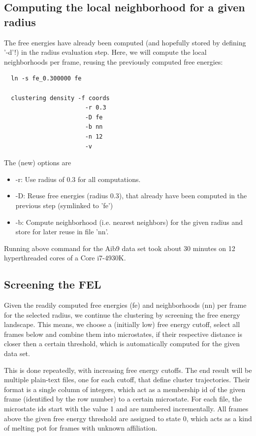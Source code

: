 \documentclass[12pt,a4paper,twoside,english,fleqn]{article}
\begin{document}
\subsection{Computing the local neighborhood for a given radius}
The free energies have already been computed (and hopefully stored by defining
'-d'!) in the radius evaluation step.
Here, we will compute the local neighborhoods per frame, reusing the previously
computed free energies:
\begin{lstlisting}
  ln -s fe_0.300000 fe

  clustering density -f coords
                       -r 0.3
                       -D fe
                       -b nn
                       -n 12
                       -v
\end{lstlisting}
The (new) options are
\begin{itemize}
  \item -r: Use radius of 0.3 for all computations.
  \item -D: Reuse free energies (radius 0.3), that already have been
            computed in the previous step (symlinked to 'fe')
  \item -b: Compute neighborhood (i.e. nearest neighbors) for the given
            radius and store for later reuse in file 'nn'.
\end{itemize}


\begin{mdframed}[innertopmargin=20pt]
  Running above command for the Aib9 data set took about 30 minutes on
  12 hyperthreaded cores of a Core i7-4930K.
\end{mdframed}




\subsection{Screening the FEL\label{sec:screening}}
Given the readily computed free energies (fe) and neighborhoods (nn)
per frame for the selected radius,
we continue the clustering by screening the free energy landscape.
This means, we choose a (initially low) free energy cutoff, select all frames
below and combine them into microstates, if their respective distance is closer
then a certain threshold, which is automatically computed for the given data
set.

This is done repeatedly, with increasing free energy cutoffs.
The end result will be multiple plain-text files, one for each cutoff, that
define cluster trajectories. Their format is a single column of integers, which
act as a membership id of the given frame (identified by the row number) to
a certain microstate.
For each file, the microstate ids start with the value 1 and are numbered
incrementally. All frames above the given free energy threshold are assigned to
state 0, which acts as a kind of melting pot for frames with unknown
affiliation.
\end{document}
